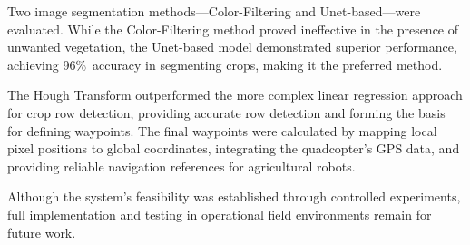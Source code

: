 \documentclass[conference]{IEEEtran}
\begin{document}
	Two image segmentation methods—Color-Filtering and Unet-based—were evaluated. While the Color-Filtering method proved ineffective in the presence of unwanted vegetation, the Unet-based model demonstrated superior performance, achieving 96\%\ accuracy in segmenting crops, making it the preferred method.
	
	The Hough Transform outperformed the more complex linear regression approach for crop row detection, providing accurate row detection and forming the basis for defining waypoints. The final waypoints were calculated by mapping local pixel positions to global coordinates, integrating the quadcopter's GPS data, and providing reliable navigation references for agricultural robots.
	
	Although the system's feasibility was established through controlled experiments, full implementation and testing in operational field environments remain for future work.
	
\end{document}

